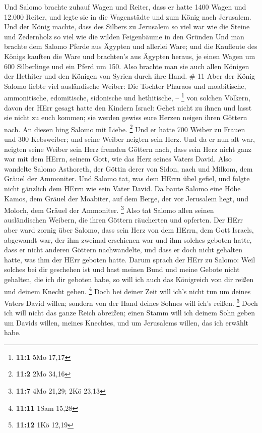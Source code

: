  Und Salomo brachte zuhauf Wagen und Reiter, dass er hatte
1400 Wagen und 12.000 Reiter, und legte sie in die Wagenstädte und zum
König nach Jerusalem.  Und der König machte, dass des
Silbers zu Jerusalem so viel war wie die Steine und Zedernholz so viel
wie die wilden Feigenbäume in den Gründen  Und man brachte
dem Salomo Pferde aus Ägypten und allerlei Ware; und die Kaufleute des
Königs kauften die Ware  und brachten's aus Ägypten heraus,
je einen Wagen um 600 Silberlinge und ein Pferd um 150. Also brachte man
sie auch allen Königen der Hethiter und den Königen von Syrien durch
ihre Hand. \# 11  Aber der König Salomo liebte viel
ausländische Weiber: Die Tochter Pharaos und moabitische, ammonitische,
edomitische, sidonische und hethitische, -- \footnote{\textbf{11:1} 5Mo
  17,17}  von solchen Völkern, davon der HErr gesagt hatte
den Kindern Israel: Gehet nicht zu ihnen und lasst sie nicht zu euch
kommen; sie werden gewiss eure Herzen neigen ihren Göttern nach. An
diesen hing Salomo mit Liebe. \footnote{\textbf{11:2} 2Mo 34,16}
 Und er hatte 700 Weiber zu Frauen und 300 Kebsweiber; und
seine Weiber neigten sein Herz.  Und da er nun alt war,
neigten seine Weiber sein Herz fremden Göttern nach, dass sein Herz
nicht ganz war mit dem HErrn, seinem Gott, wie das Herz seines Vaters
David.  Also wandelte Salomo Asthoreth, der Göttin derer von
Sidon, nach und Milkom, dem Gräuel der Ammoniter.  Und
Salomo tat, was dem HErrn übel gefiel, und folgte nicht gänzlich dem
HErrn wie sein Vater David.  Da baute Salomo eine Höhe
Kamos, dem Gräuel der Moabiter, auf dem Berge, der vor Jerusalem liegt,
und Moloch, dem Gräuel der Ammoniter. \footnote{\textbf{11:7} 4Mo 21,29;
  2Kö 23,13}  Also tat Salomo allen seinen ausländischen
Weibern, die ihren Göttern räucherten und opferten.  Der
HErr aber ward zornig über Salomo, dass sein Herz von dem HErrn, dem
Gott Israels, abgewandt war, der ihm zweimal erschienen war
 und ihm solches geboten hatte, dass er nicht anderen
Göttern nachwandelte, und dass er doch nicht gehalten hatte, was ihm der
HErr geboten hatte.  Darum sprach der HErr zu Salomo: Weil
solches bei dir geschehen ist und hast meinen Bund und meine Gebote
nicht gehalten, die ich dir geboten habe, so will ich auch das
Königreich von dir reißen und deinem Knecht geben. \footnote{\textbf{11:11}
  1Sam 15,28}  Doch bei deiner Zeit will ich's nicht tun um
deines Vaters David willen; sondern von der Hand deines Sohnes will
ich's reißen. \footnote{\textbf{11:12} 1Kö 12,19}  Doch ich
will nicht das ganze Reich abreißen; einen Stamm will ich deinem Sohn
geben um Davids willen, meines Knechtes, und um Jerusalems willen, das
ich erwählt habe.

